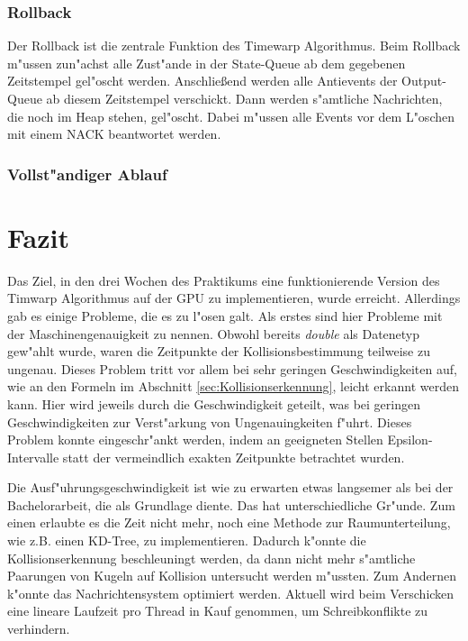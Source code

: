 \documentclass[a4paper, 10pt, openright, parskip, chapterprefix]{scrreprt}
\begin{document}
\subsection{Rollback}
\label{subsec:Rollback}
Der Rollback ist die zentrale Funktion des Timewarp Algorithmus. Beim Rollback m"ussen zun"achst alle Zust"ande in der
State-Queue ab dem gegebenen Zeitstempel gel"oscht werden. Anschlie\ss end werden alle Antievents der Output-Queue ab
diesem Zeitstempel verschickt. Dann werden s"amtliche Nachrichten, die noch im Heap stehen, gel"oscht. Dabei m"ussen
alle Events vor dem L"oschen mit einem NACK beantwortet werden.

\subsection{Vollst"andiger Ablauf}

\chapter{Fazit}
Das Ziel, in den drei Wochen des Praktikums eine funktionierende Version des Timwarp Algorithmus auf der GPU zu implementieren,
wurde erreicht. Allerdings gab es einige Probleme, die es zu l"osen galt. Als erstes sind hier Probleme mit der Maschinengenauigkeit zu nennen.
Obwohl bereits \emph{double} als Datenetyp gew"ahlt wurde, waren die Zeitpunkte der Kollisionsbestimmung teilweise zu ungenau.
Dieses Problem tritt vor allem bei sehr geringen Geschwindigkeiten auf, wie an den Formeln im Abschnitt \ref{sec:Kollisionserkennung}, leicht
erkannt werden kann. Hier wird jeweils durch die Geschwindigkeit geteilt, was bei geringen Geschwindigkeiten zur Verst"arkung von Ungenauingkeiten
f"uhrt. Dieses Problem konnte eingeschr"ankt werden, indem an geeigneten Stellen Epsilon-Intervalle statt der vermeindlich exakten Zeitpunkte betrachtet
wurden.

Die Ausf"uhrungsgeschwindigkeit ist wie zu erwarten etwas langsemer als bei der Bachelorarbeit, die als Grundlage diente. Das hat unterschiedliche 
Gr"unde. Zum einen erlaubte es die Zeit nicht mehr, noch eine Methode zur Raumunterteilung, wie z.B. einen KD-Tree, zu implementieren. Dadurch 
k"onnte die Kollisionserkennung beschleuningt werden, da dann nicht mehr s"amtliche Paarungen von Kugeln auf Kollision untersucht werden m"ussten.
Zum Andernen k"onnte das Nachrichtensystem optimiert werden. Aktuell wird beim Verschicken eine lineare Laufzeit pro Thread in Kauf genommen,
um Schreibkonflikte zu verhindern.
\end{document}
